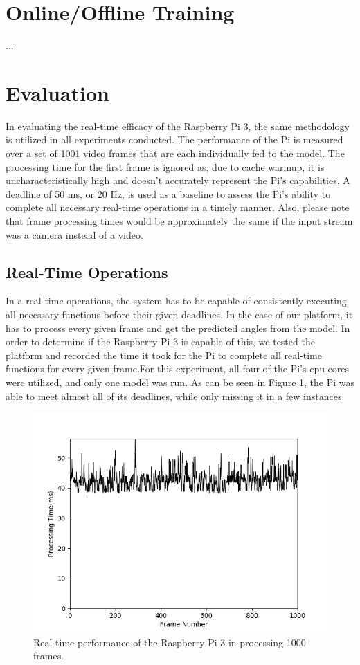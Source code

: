 \documentclass[10pt, conference]{IEEEtran}
\begin{document}
\section{Online/Offline Training}
...
\section{Evaluation}
In evaluating the real-time efficacy of the Raspberry Pi 3, the same methodology is utilized in all 
experiments conducted. The performance of the Pi is measured over a set of 1001 video frames that are 
each individually fed to the model. The processing time for the first frame is ignored as, due to 
cache warmup, it is uncharacteristically high and doesn't accurately represent the Pi's capabilities. A 
deadline of 50 ms, or 20 Hz, is used as a baseline to assess the Pi's ability to complete all 
necessary real-time operations in a timely manner. Also, please note that frame processing times 
would be approximately the same if the input stream was a 
camera instead of a video. 

\subsection{Real-Time Operations}
In a real-time operations, the system has to be capable of consistently executing all necessary 
functions before their given deadlines. In the case of our platform, it has to process every given frame 
and get the predicted angles from the model. In order to determine if the Raspberry Pi 3 is capable of 
this, we tested the platform and recorded the time it took for the Pi to complete all real-time 
functions for every given frame.For this experiment, all four of the Pi's cpu cores were utilized, and 
only one model was run. As can be seen in Figure 1, the Pi was able to meet almost all of its deadlines, 
while only missing it in a few instances.

\begin{figure}[h]
  \centering
  \includegraphics[width=.5\textwidth]{Total_Processing_Time}
  \caption{ Real-time performance of the Raspberry Pi 3 in processing 1000 frames.}
\end{figure}
\end{document}
